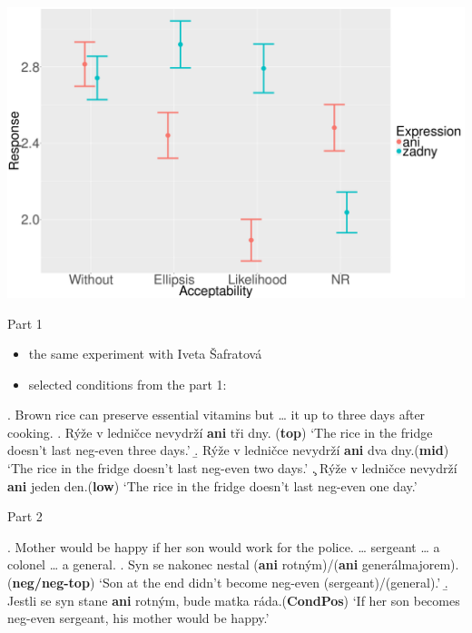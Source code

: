 \documentclass[ignorenonframetext,]{beamer}
\providecommand{\tightlist}{%
  \setlength{\itemsep}{0pt}\setlength{\parskip}{0pt}}
\newcommand{\cond}[1]{\textbf{#1}}
\begin{document}
\begin{frame}

\begin{center}
\includegraphics[scale=0.23]{mean-sum.png}
\end{center}

\end{frame}

\begin{frame}{Part 1}

\begin{itemize}
\tightlist
\item
  the same experiment with Iveta Šafratová
\item
  selected conditions from the part 1:
\end{itemize}

\ex. Brown rice can preserve essential vitamins but \ldots{} it up to
three days after cooking.\label{ex-2} \a. Rýže v ledničce nevydrží
\textbf{ani} tři dny. \label{ex-1-a}\hfill (\cond{top})\newline
`The rice in the fridge doesn't last neg-even three days.' \b. Rýže v
ledničce nevydrží \textbf{ani} dva
dny.\label{ex-1-b}\hfill (\cond{mid})\newline
`The rice in the fridge doesn't last neg-even two days.' \c. Rýže v
ledničce nevydrží \textbf{ani} jeden
den.\hfill (\cond{low})\label{ex-1-c}\newline
`The rice in the fridge doesn't last neg-even one day.'

\end{frame}

\begin{frame}{Part 2}

\ex. Mother would be happy if her son would work for the police.
\ldots{} sergeant \ldots{} a colonel \ldots{} a general.\label{ex-3} \a.
Syn se nakonec nestal (\textbf{ani} rotným)/(\textbf{ani}
generálmajorem).\hfill (\cond{neg/neg-top}) \label{ex-3-a}\newline
`Son at the end didn't become neg-even (sergeant)/(general).' \b. Jestli
se syn stane \textbf{ani} rotným, bude matka
ráda.\hfill{(\cond{CondPos})}\label{ex-2-b}\newline
`If her son becomes neg-even sergeant, his mother would be happy.'

\end{frame}
\end{document}

